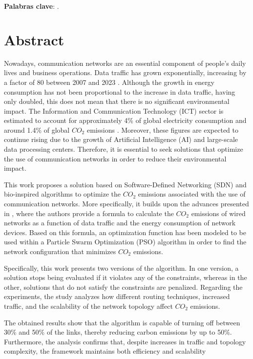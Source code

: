 \documentclass[minitoc, hidelinks, headlogo, framedcover]{tfeEPCC}
\begin{document}
\noindent\textbf{Palabras clave}: \printkeywords.

\chapter*{Abstract}
Nowadays, communication networks are an essential component of people’s daily lives and business operations. Data traffic has grown exponentially, increasing by a factor of 80 between 2007 and 2023 \cite{Paska2025}. Although the growth in energy consumption has not been proportional to the increase in data traffic, having only doubled, this does not mean that there is no significant environmental impact. The Information and Communication Technology (ICT) sector is estimated to account for approximately 4\% of global electricity consumption and around 1.4\% of global $CO_2$ emissions \cite{malmodin2024ict}. Moreover, these figures are expected to continue rising due to the growth of Artificial Intelligence (AI) and large-scale data processing centers. Therefore, it is essential to seek solutions that optimize the use of communication networks in order to reduce their environmental impact.

This work proposes a solution based on Software-Defined Networking (SDN) and bio-inspired algorithms to optimize the $CO_2$ emissions associated with the use of communication networks. More specifically, it builds upon the advances presented in \cite{ElZahr2023}, where the authors provide a formula to calculate the $CO_2$ emissions of wired networks as a function of data traffic and the energy consumption of network devices. Based on this formula, an optimization function has been modeled to be used within a Particle Swarm Optimization (PSO) algorithm in order to find the network configuration that minimizes $CO_2$ emissions.

Specifically, this work presents two versions of the algorithm. In one version, a solution stops being evaluated if it violates any of the constraints, whereas in the other, solutions that do not satisfy the constraints are penalized. Regarding the experiments, the study analyzes how different routing techniques, increased traffic, and the scalability of the network topology affect $CO_2$ emissions.

The obtained results show that the algorithm is capable of turning off between 30\% and 50\% of the links, thereby reducing carbon emissions by up to 50\%. Furthermore, the analysis confirms that, despite increases in traffic and topology complexity, the framework maintains both efficiency and scalability
\end{document}
